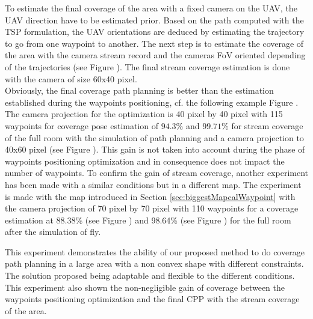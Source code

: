 To estimate the final coverage of the area with a fixed camera on the UAV, the UAV direction have to be estimated prior. 
Based on the path computed with the TSP formulation, the UAV orientations are deduced by estimating the trajectory to go from one waypoint to another.
The next step is to estimate the coverage of the area with the camera stream record and the cameras FoV oriented depending of the trajectories (see Figure ). The final stream coverage estimation is done with the camera of size 60x40 pixel. \\
Obviously, the final coverage path planning is better than the estimation established during the waypoints positioning, cf. the following example Figure . The camera projection for the optimization  is 40 pixel by 40 pixel with 115 waypoints for coverage pose estimation of $94.3\%$ and $99.71\%$ for stream coverage of the full room with the simulation of path planning and a camera projection to 40x60 pixel (see Figure ). This gain is not taken into account during the phase of waypoints positioning optimization and in consequence does not impact the number of waypoints.%
To confirm the gain of stream coverage, another experiment has been made with a similar conditions but in a different map. The experiment is made with the map introduced in Section \ref{sec:biggestMapcalWaypoint} with the camera projection of 70 pixel by 70 pixel with 110 waypoints for a coverage estimation at 88.38\%  (see Figure ) and 98.64\% (see Figure ) for the full room after the simulation of fly.

This experiment demonstrates the ability of our proposed method to do coverage path planning in a large area with a non convex shape with different constraints. The solution proposed being adaptable and flexible to the different conditions. This experiment also shown the non-negligible gain of coverage between the waypoints positioning optimization and the final CPP with the stream coverage of the area.




